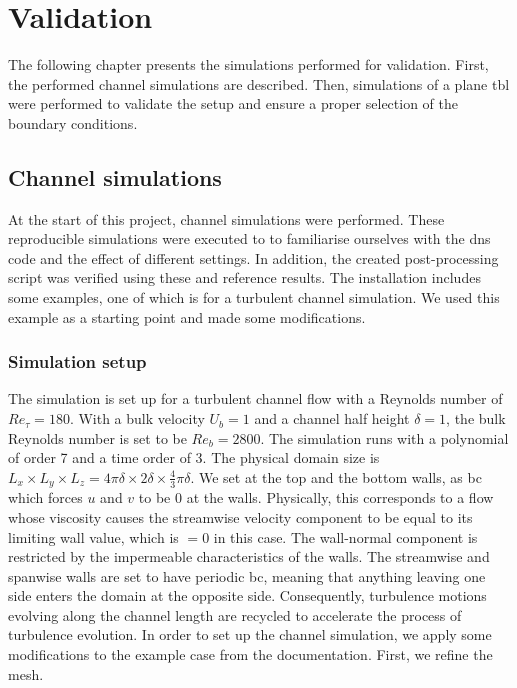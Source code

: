 \chapter{Validation} \label{chap:validation}

The following chapter presents the simulations performed for validation.
First, the performed channel simulations are described.
Then, simulations of a plane \acrshort{tbl} were performed to validate the setup and ensure a proper selection of the boundary conditions.

\section{Channel simulations}\label{sec:channel}
At the start of this project, channel simulations were performed. 
These reproducible simulations were executed to to familiarise ourselves  with the \acrshort{dns} code and the effect of different settings. 
In addition, the created post-processing script was verified using these  and reference results.
The  installation includes some examples, one of which is for a turbulent channel simulation.
We used this example as a starting point and made some modifications.

\subsection{Simulation setup}

The simulation is set up for a turbulent channel flow  with a Reynolds number of  $Re_\tau = 180$.
With a bulk velocity $U_b = 1$ and a channel half height $\delta = 1$, the bulk Reynolds number is set to be $Re_b = 2800$.
The simulation runs with a polynomial of order 7 and a time order of 3.
The physical domain size is $ L_x \times L_y \times L_z = 4\pi \delta \times 2 \delta \times \frac{4}{3}\pi \delta$.
We set 
at the top and the bottom walls, as \acrshort{bc} which forces $u$ and $v$ to be 0 at the walls.
Physically, this  corresponds to a flow whose viscosity causes the streamwise velocity component to be equal to its limiting wall value, which is $=0$ in this case. 
The wall-normal component is restricted by the impermeable characteristics of the walls.
The streamwise and spanwise walls are set to have periodic \acrlong{bc}, meaning that  anything leaving one side enters the domain at the opposite side.
Consequently, turbulence motions evolving along the channel length are recycled to accelerate  the process of turbulence evolution.
In order to set up the channel simulation, we apply some  modifications to the example case from the  documentation.
First, we refine the mesh.


